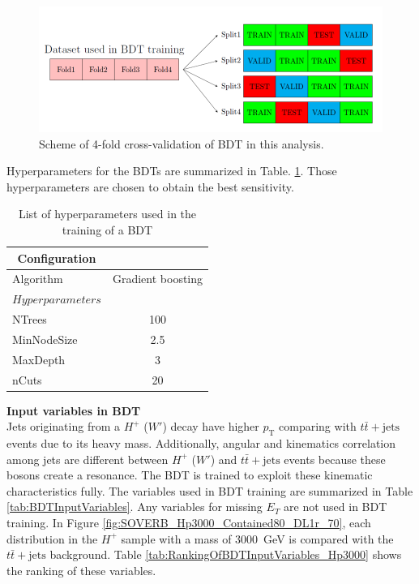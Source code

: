 \begin{description}
    \begin{figure}[H]
        \centering
        \includegraphics[keepaspectratio,scale=0.65]{images/AnalysisStrategy/CrossValidationScheme.png}
        \caption{Scheme of 4-fold cross-validation of BDT in this analysis.}
        \label{fig:CrossValidationScheme}
    \end{figure}
    
    Hyperparameters for the BDTs are summarized in Table. \ref{tab:Hyperparameters}. Those hyperparameters are chosen to obtain the best sensitivity.

    \begin{table}[H]
      \centering
      \begin{tabular*}{75mm}{@{\extracolsep{\fill}}ll}
        \hline
        \multicolumn{1}{c}{Configuration} & \multicolumn{1}{c}{}\\
        \hline\hline
        \multicolumn{1}{l}{Algorithm}     & \multicolumn{1}{c}{Gradient boosting}\\
        \hline
        $Hyperparameters$ & \\
        \multicolumn{1}{l}{NTrees}       & \multicolumn{1}{c}{100}\\
        \multicolumn{1}{l}{MinNodeSize}  & \multicolumn{1}{c}{2.5}\\
        \multicolumn{1}{l}{MaxDepth}     & \multicolumn{1}{c}{3}\\
        \multicolumn{1}{l}{nCuts}        & \multicolumn{1}{c}{20}\\
        \hline
      \end{tabular*}
      \caption{List of hyperparameters used in the training of a BDT}
      \label{tab:Hyperparameters}
    \end{table}

    \item{\textbf{Input variables in BDT}}\mbox{}\\
    \label{item:BDTInputVars}
    Jets originating from a $H^{+}$ ($W'$) decay have higher $p_\text{T}$ comparing with $t\bar{t}+\text{jets}$ events due to its heavy mass. Additionally, angular and kinematics correlation among jets are different between $H^{+}$ ($W'$) and $t\bar{t}+\text{jets}$ events because these bosons create a resonance. The BDT is trained to exploit these kinematic characteristics fully. The variables used in BDT training are summarized in Table \ref{tab:BDTInputVariables}. Any variables for missing $E_{T}$ are not used in BDT training. In Figure \ref{fig:SOVERB_Hp3000_Contained80_DL1r_70}, each distribution in the $H^{+}$ sample with a mass of 3000~GeV is compared with the $t\bar{t}+\text{jets}$ background. Table \ref{tab:RankingOfBDTInputVariables_Hp3000} shows the ranking of these variables.


\end{description}
